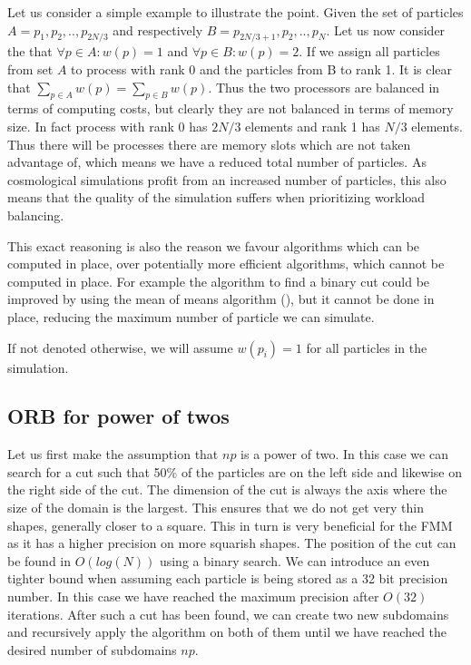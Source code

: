 \documentclass[]{article}
\begin{document}
Let us consider a simple example to illustrate the point. Given the set of particles $A = {p_1, p_2, .., p_{2N/3}}$ and respectively $B = {p_{2N/3 + 1}, p_2, .., p_{N}}$. Let us now consider the that $\forall p \in A : w(p) = 1$ and $\forall p \in B : w(p) = 2$. If we assign all particles from set $A$ to process with rank 0 and the particles from B to rank 1. It is clear that $\sum_{p\in A}^{} w(p) = \sum_{p\in B}^{} w(p)$. Thus the two processors are balanced in terms of computing costs, but clearly they are not balanced in terms of memory size. In fact process with rank 0 has $2N/3$ elements and rank 1 has $N/3$ elements. Thus there will be processes there are memory slots which are not taken advantage of, which means we have a reduced total number of particles. As cosmological simulations profit from an increased number of particles, this also means that the quality of the simulation suffers when prioritizing workload balancing.

This exact reasoning is also the reason we favour algorithms which can be computed in place, over potentially more efficient algorithms, which cannot be computed in place. For example the algorithm to find a binary cut could be improved by using the mean of means algorithm (), but it cannot be done in place, reducing the maximum number of particle we can simulate.


If not denoted otherwise, we will assume $w(p_i) = 1$ for all particles in the simulation.

\subsection{ORB for power of twos}

Let us first make the assumption that $np$ is a power of two. In this case we can search for a cut such that 50\% of the particles are on the left side and likewise on the right side of the cut. The dimension of the cut is always the axis where the size of the domain is the largest. This ensures that we do not get very thin shapes, generally closer to a square. This in turn is very beneficial for the FMM as it has a higher precision on more squarish shapes.  The position of the cut can be found in $O(log(N))$ using a binary search. We can introduce an even tighter bound when assuming each particle is being stored as a 32 bit precision number. In this case we have reached the maximum precision after $O(32)$ iterations. After such a cut has been found, we can create two new subdomains and recursively apply the algorithm on both of them until we have reached the desired number of subdomains $np$. 
 
\end{document}
